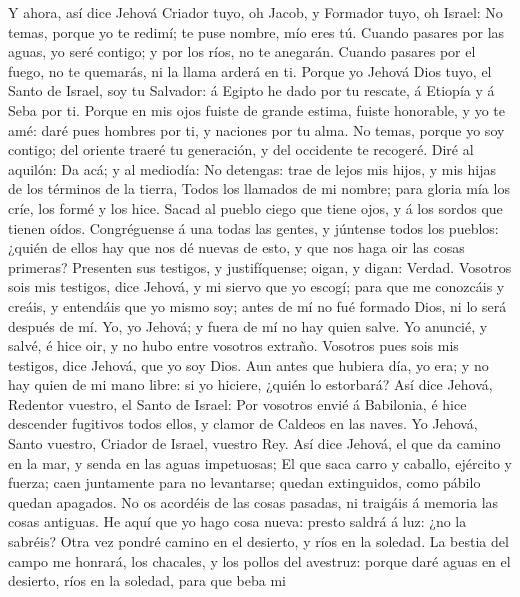  Y ahora, así dice Jehová Criador tuyo, oh Jacob, y Formador
tuyo, oh Israel: No temas, porque yo te redimí; te puse nombre, mío eres
tú.  Cuando pasares por las aguas, yo seré contigo; y por
los ríos, no te anegarán. Cuando pasares por el fuego, no te quemarás,
ni la llama arderá en ti.  Porque yo Jehová Dios tuyo, el
Santo de Israel, soy tu Salvador: á Egipto he dado por tu rescate, á
Etiopía y á Seba por ti.  Porque en mis ojos fuiste de
grande estima, fuiste honorable, y yo te amé: daré pues hombres por ti,
y naciones por tu alma.  No temas, porque yo soy contigo;
del oriente traeré tu generación, y del occidente te recogeré.
 Diré al aquilón: Da acá; y al mediodía: No detengas: trae
de lejos mis hijos, y mis hijas de los términos de la tierra,
 Todos los llamados de mi nombre; para gloria mía los críe,
los formé y los hice.  Sacad al pueblo ciego que tiene ojos,
y á los sordos que tienen oídos.  Congréguense á una todas
las gentes, y júntense todos los pueblos: ¿quién de ellos hay que nos dé
nuevas de esto, y que nos haga oir las cosas primeras? Presenten sus
testigos, y justifíquense; oigan, y digan: Verdad. 
Vosotros sois mis testigos, dice Jehová, y mi siervo que yo escogí; para
que me conozcáis y creáis, y entendáis que yo mismo soy; antes de mí no
fué formado Dios, ni lo será después de mí.  Yo, yo Jehová;
y fuera de mí no hay quien salve.  Yo anuncié, y salvé, é
hice oir, y no hubo entre vosotros extraño. Vosotros pues sois mis
testigos, dice Jehová, que yo soy Dios.  Aun antes que
hubiera día, yo era; y no hay quien de mi mano libre: si yo hiciere,
¿quién lo estorbará?  Así dice Jehová, Redentor vuestro, el
Santo de Israel: Por vosotros envié á Babilonia, é hice descender
fugitivos todos ellos, y clamor de Caldeos en las naves. 
Yo Jehová, Santo vuestro, Criador de Israel, vuestro Rey. 
Así dice Jehová, el que da camino en la mar, y senda en las aguas
impetuosas;  El que saca carro y caballo, ejército y
fuerza; caen juntamente para no levantarse; quedan extinguidos, como
pábilo quedan apagados.  No os acordéis de las cosas
pasadas, ni traigáis á memoria las cosas antiguas.  He aquí
que yo hago cosa nueva: presto saldrá á luz: ¿no la sabréis? Otra vez
pondré camino en el desierto, y ríos en la soledad.  La
bestia del campo me honrará, los chacales, y los pollos del avestruz:
porque daré aguas en el desierto, ríos en la soledad, para que beba mi
